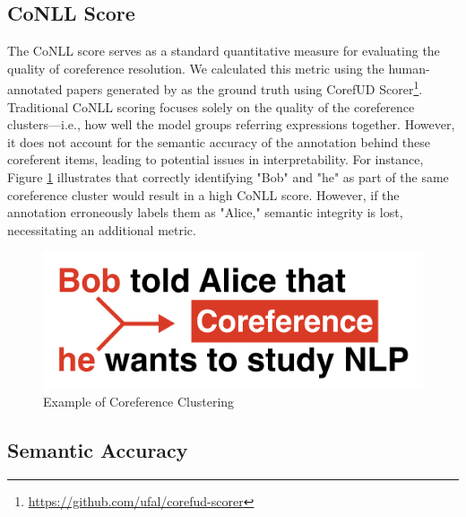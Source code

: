 \subsection{CoNLL Score}
The CoNLL score serves as a standard quantitative measure for evaluating the quality of coreference resolution. We calculated this metric using the human-annotated papers generated by \citet{asakura2022building} as the ground truth using CorefUD Scorer\footnote{\url{https://github.com/ufal/corefud-scorer}}. Traditional CoNLL scoring focuses solely on the quality of the coreference clusters—i.e., how well the model groups referring expressions together. However, it does not account for the semantic accuracy of the annotation behind these coreferent items, leading to potential issues in interpretability. For instance, Figure \ref{fig:coreference} illustrates that correctly identifying "Bob" and "he" as part of the same coreference cluster would result in a high CoNLL score. However, if the annotation erroneously labels them as "Alice," semantic integrity is lost, necessitating an additional metric.

\begin{figure}[htpb]
  \centering
  \begin{minipage}{\textwidth}
    \centering
    \includegraphics[width=14cm]{images/coreference.png}
    \caption[Example for coreference]{Example of Coreference Clustering \citep{asakura2022building}\footnotemark}
    \label{fig:coreference}
  \end{minipage}
\end{figure}

\subsection{Semantic Accuracy}

